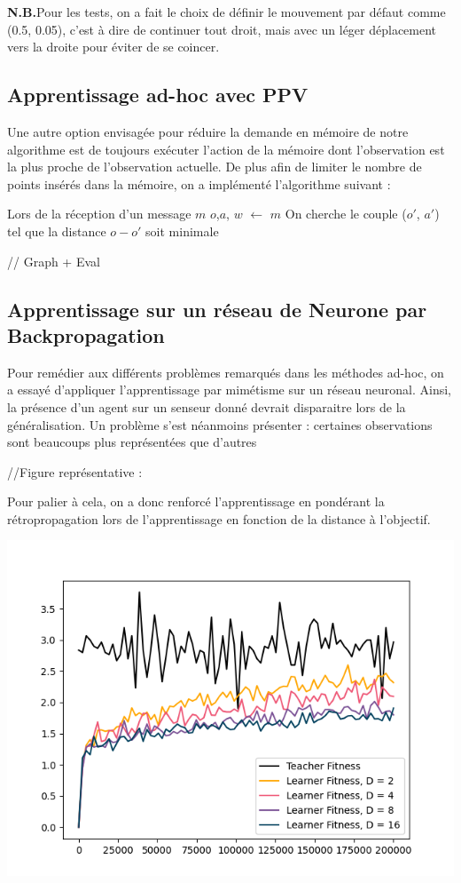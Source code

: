 \documentclass[a4paper, 12pt]{report}
\begin{document}
	
	\textbf{N.B.}Pour les tests, on a fait le choix de définir le mouvement par défaut comme (0.5, 0.05), c'est à dire de continuer tout droit, mais avec un léger déplacement vers la droite pour éviter de se coincer.
	
	\subsection{Apprentissage ad-hoc avec PPV}
	Une autre option envisagée pour réduire la demande en mémoire de notre algorithme est de toujours exécuter l'action de la mémoire dont l'observation est la plus proche de l'observation actuelle.
	De plus afin de limiter le nombre de points insérés dans la mémoire, on a implémenté l'algorithme suivant :
	
\begin{algorithm}[H]
	\SetAlgoLined
	Lors de la réception d'un message $m$\;
	$o$,$a$, $w$ $\leftarrow$ $m$
	On cherche le couple ($o'$, $a'$) tel que la distance $o-o'$ soit minimale\;
\end{algorithm}
	
 // Graph + Eval
	
	\subsection{Apprentissage sur un réseau de Neurone par Backpropagation}
	Pour remédier aux différents problèmes remarqués dans les méthodes ad-hoc, on a essayé d'appliquer l'apprentissage par mimétisme sur un réseau neuronal. Ainsi, la présence d'un agent sur un senseur donné devrait disparaitre lors de la généralisation.
	Un problème s'est néanmoins présenter : certaines observations sont beaucoups plus représentées que d'autres
	
	//Figure représentative :
	
	Pour palier à cela, on a donc renforcé l'apprentissage en pondérant la rétropropagation lors de l'apprentissage en fonction de la distance à l'objectif.
	
	\includegraphics{averageComparisons}
	
\end{document}
